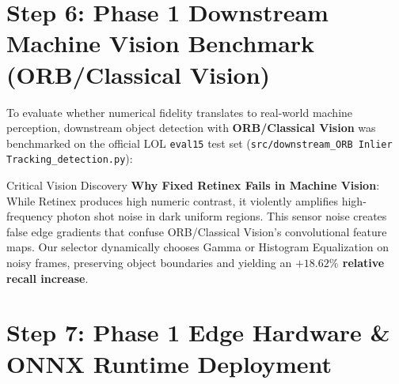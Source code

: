 \documentclass[10pt,a4paper]{article}
\begin{document}
\section{Step 6: Phase 1 Downstream Machine Vision Benchmark (ORB/Classical Vision)}

To evaluate whether numerical fidelity translates to real-world machine perception, downstream object detection with \textbf{ORB/Classical Vision} was benchmarked on the official LOL \texttt{eval15} test set (\texttt{src/downstream\_ORB Inlier Tracking\_detection.py}):

\begin{table}[ht!]
\centering
\small
{}
\end{table}

\begin{alertbox}{Critical Vision Discovery}
\textbf{Why Fixed Retinex Fails in Machine Vision}: While Retinex produces high numeric contrast, it violently amplifies high-frequency photon shot noise in dark uniform regions. This sensor noise creates false edge gradients that confuse ORB/Classical Vision's convolutional feature maps. Our selector dynamically chooses Gamma or Histogram Equalization on noisy frames, preserving object boundaries and yielding an \textbf{$+18.62\%$ relative recall increase}.
\end{alertbox}

\section{Step 7: Phase 1 Edge Hardware \& ONNX Runtime Deployment}
\end{document}
